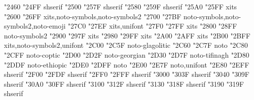 \documentclass{article}
\begin{document}
                         {  "2460} {  "24FF} {shserif}
                                    {  "2500} {  "257F} {shserif}
                                 {  "2580} {  "259F} {shserif}
                               {  "25A0} {  "25FF} {xits}
                          {  "2600} {  "26FF} {xits,noto-symbols,noto-symbols2}
                                       {  "2700} {  "27BF} {noto-symbols,noto-symbols2,noto-emoji}
           {  "27C0} {  "27EF} {xits,unifont}
                          {  "27F0} {  "27FF} {xits}
                               {  "2800} {  "28FF} {noto-symbols2}
                          {  "2900} {  "297F} {xits}
           {  "2980} {  "29FF} {xits}
            {  "2A00} {  "2AFF} {xits}
               {  "2B00} {  "2BFF} {xits,noto-symbols2,unifont}
                                     {  "2C00} {  "2C5F} {noto-glagolitic}
                               {  "2C60} {  "2C7F} {noto}
                                         {  "2C80} {  "2CFF} {noto-coptic}
                            {  "2D00} {  "2D2F} {noto-georgian}
                                       {  "2D30} {  "2D7F} {noto-tifinagh}
                              {  "2D80} {  "2DDF} {noto-ethiopic}
                            {  "2DE0} {  "2DFF} {noto}
                       {  "2E00} {  "2E7F} {noto,unifont}
                        {  "2E80} {  "2EFF} {shserif}
                                {  "2F00} {  "2FDF} {shserif}
             {  "2FF0} {  "2FFF} {shserif}
                    {  "3000} {  "303F} {shserif}
                                       {  "3040} {  "309F} {shserif}
                                       {  "30A0} {  "30FF} {shserif}
                                       {  "3100} {  "312F} {shserif}
                      {  "3130} {  "318F} {shserif}
                                         {  "3190} {  "319F} {shserif}
\end{document}
